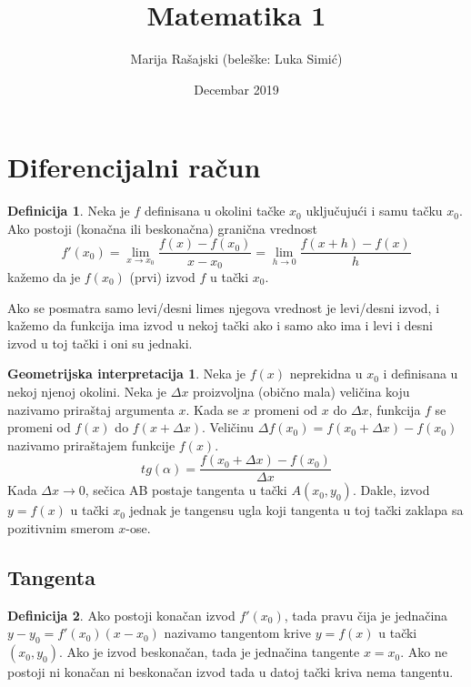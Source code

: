 \documentclass{article}
\title{Matematika 1}
\author{Marija Rašajski (beleške: Luka Simić)}
\date{Decembar 2019}
\theoremstyle{definition}
\newtheorem{definition}{Definicija}[section]
\newtheorem{ginterpretation}{Geometrijska interpretacija}[section]
\begin{document}
\maketitle

    \section{Diferencijalni račun}
        \begin{definition}
            Neka je $f$ definisana u okolini tačke $x_0$ uključujući i samu tačku $x_0$. Ako postoji (konačna ili beskonačna) granična vrednost
            $$f'(x_0) = \lim_{x \to x_0} \frac{f(x) - f(x_0)}{x - x_0} = \lim_{h \to 0} \frac{f(x + h) - f(x)}{h}$$
            kažemo da je $f(x_0)$ (prvi) izvod $f$ u tački $x_0$.
        
            Ako se posmatra samo levi/desni limes njegova vrednost je levi/desni izvod, i kažemo da funkcija ima izvod u nekoj tački ako i samo ako ima i levi i desni izvod u toj tački i oni su jednaki.
        \end{definition}

        \begin{ginterpretation}
            Neka je $f(x)$ neprekidna u $x_0$ i definisana u nekoj njenoj okolini. Neka je $\Delta x$ proizvoljna (obično mala) veličina koju nazivamo priraštaj argumenta $x$. Kada se $x$ promeni od $x$ do $\Delta x$, funkcija $f$ se promeni od $f(x)$ do $f(x + \Delta x)$. Veličinu $\Delta f(x_0) = f(x_0 + \Delta x) - f(x_0)$ nazivamo priraštajem funkcije $f(x)$.
            $$tg(\alpha) = \frac{f(x_0 + \Delta x) - f(x_0)}{\Delta x}$$
            Kada $\Delta x\to0$, sečica AB postaje tangenta u tački $A(x_0, y_0)$. Dakle, izvod $y = f(x)$ u tački $x_0$ jednak je tangensu ugla koji tangenta u toj tački zaklapa sa pozitivnim smerom $x$-ose.
        \end{ginterpretation}

        \subsection{Tangenta}
            \begin{definition}
                Ako postoji konačan izvod $f'(x_0)$, tada pravu čija je jednačina $y - y_0 = f'(x_0)(x - x_0)$ nazivamo tangentom krive $y = f(x)$ u tački $(x_0, y_0)$.
                Ako je izvod beskonačan, tada je jednačina tangente $x = x_0$. Ako ne postoji ni konačan ni beskonačan izvod tada u datoj tački kriva nema tangentu.
            \end{definition}
\end{document}

